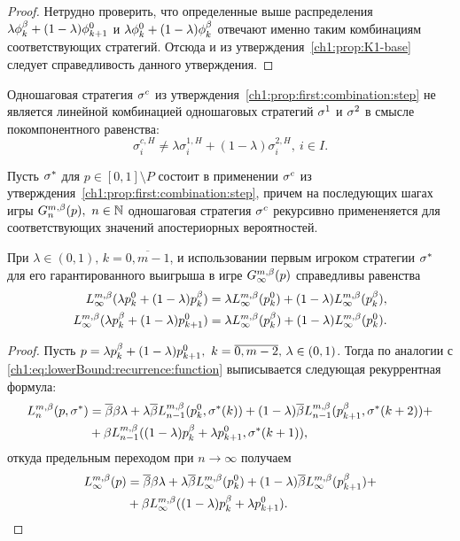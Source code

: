 {\begin{proof}
  Нетрудно проверить, что определенные выше распределения $\lambda \fOdd + (1-\lambda) \fEven[k+1]$ и $\lambda \fEven + (1-\lambda) \fOdd$ отвечают именно таким комбинациям соответствующих стратегий.
  Отсюда и из утверждения~\ref{ch1:prop:K1-base} следует справедливость данного утверждения.
\end{proof}

\begin{remark}
  Одношаговая стратегия $\sigmar^c$ из утверждения~\ref{ch1:prop:first:combination:step} не является линейной комбинацией одношаговых стратегий $\sigmar^1$ и $\sigmar^2$ в смысле покомпонентного равенства:
  \[
    \sigma^{c,H}_i \neq \lambda \sigma^{1,H}_i + (1-\lambda) \sigma^{2,H}_i,\ i \in I.
  \]
\end{remark}

Пусть $\sigmar^*$ для $p \in [0,1] \setminus P$ состоит в применении $\sigmar^c$ из утверждения~\ref{ch1:prop:first:combination:step}, причем на последующих шагах игры $\theG*{n}(p),\ n \in \N$ одношаговая стратегия $\sigmar^c$ рекурсивно примененяется для соответствующих значений апостериорных вероятностей.

\begin{proposition}
  \label{ch1:prop:first:combination:game}
  При $\lambda \in (0, 1), \, k = \overline{0, m-1}$, и использовании первым игроком стратегии $\sigmar^*$ для его гарантированного выигрыша в игре $\theG*{\infty}(p)$ справедливы равенства
  \begin{align*}
    \L*{\infty}(\lambda \pEven + (1-\lambda) \pOdd)      
    &= 
      \lambda \L*{\infty}(\pEven) + (1-\lambda) \L*{\infty}(\pOdd), \\
    \L*\infty(\lambda \pOdd + (1-\lambda) \pEven[k+1]) 
    &= \lambda \L*{\infty}( \pOdd ) + (1-\lambda) \L*{\infty}(\pEven).
  \end{align*}
\end{proposition}
\begin{proof}
  Пусть $p = \lambda \pOdd + (1-\lambda) \pEven[k+1],\ k = \overline{0, m - 2}, \, \lambda \in (0, 1)$.
  Тогда по аналогии с \eqref{ch1:eq:lowerBound:recurrence:function} выписывается следующая рекуррентная формула:
  \begin{align*}
    \L*{n}(p, \sigmar^*)
    &= \DCo \Co \lambda +
      \lambda \DCo \L*{n-1}(\pEven, \sigmaran{*}{k}) +
      (1-\lambda) \DCo \L*{n-1}(\pOdd[k+1], \sigmaran{*}{k+2}) + \\
    &+ \Co \L*{n-1}((1-\lambda) \pOdd + \lambda \pEven[k+1], \sigmaran{*}{k+1}),
  \end{align*}
  откуда предельным переходом при $n \rightarrow \infty$ получаем
  \begin{equation}
    \label{ch1:eq:prop:L(comb)}
    \begin{aligned}
    \L*{\infty}(p) 
    &= \DCo \Co \lambda +
    \lambda \DCo \L*{\infty}(\pEven) +
    (1-\lambda) \DCo \L*{\infty}(\pOdd[k+1]) + \\
    &+ \Co \L*{\infty}( (1-\lambda) \pOdd + \lambda \pEven[k+1] ).
    \end{aligned}
  \end{equation}
  

\end{proof}}
